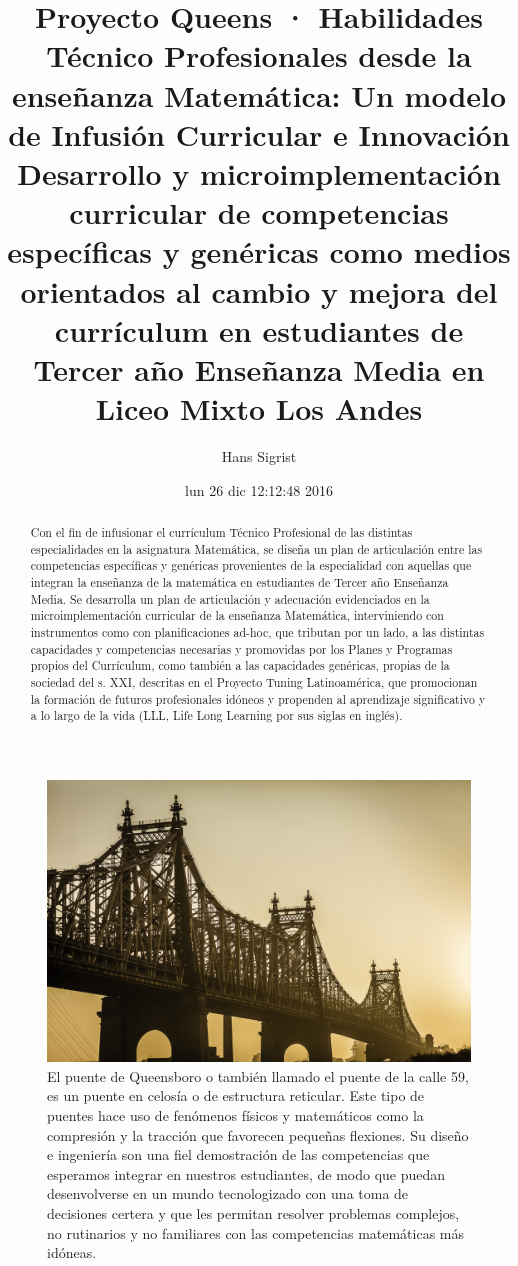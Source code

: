 \documentclass[12pt,letterpaper,article,x11names]{memoir}
\title{}
\author{Hans Sigrist}
\date{lun 26 dic 12:12:48 2016}
\title{Proyecto Queens · Habilidades Técnico Profesionales desde la enseñanza Matemática: Un modelo de Infusión Curricular e Innovación\\\medskip
\large Desarrollo y microimplementación curricular de competencias específicas y genéricas como medios orientados al cambio y mejora del currículum en estudiantes de Tercer año Enseñanza Media en Liceo Mixto Los Andes}
\begin{document}
\maketitle
\begin{abstract}
Con el fin de infusionar el currículum Técnico Profesional de las distintas especialidades en la asignatura Matemática, se diseña un plan de articulación entre las competencias específicas y genéricas provenientes de la especialidad con aquellas que integran la enseñanza de la matemática en estudiantes de Tercer año Enseñanza Media. Se desarrolla un plan de articulación y adecuación evidenciados en la microimplementación curricular de la enseñanza Matemática, interviniendo con instrumentos como con planificaciones ad-hoc, que tributan por un lado, a las distintas capacidades y competencias necesarias y promovidas por los Planes y Programas propios del Currículum, como también a las capacidades genéricas, propias de la sociedad del s. XXI, descritas en el Proyecto Tuning Latinoamérica, que promocionan la formación de futuros profesionales idóneos y propenden al aprendizaje significativo y a lo largo de la vida (LLL, Life Long Learning por sus siglas en inglés).
\end{abstract}

\begin{figure}[htbp]
\centering
\includegraphics[width=.9\linewidth]{queens.jpg}
\caption{\label{fig:org05cedaa}
El puente de Queensboro o también llamado el puente de la calle 59, es un puente en celosía o de estructura reticular. Este tipo de puentes hace uso de fenómenos físicos y matemáticos como la compresión y la tracción que favorecen pequeñas flexiones. Su diseño e ingeniería son una fiel demostración de las competencias que esperamos integrar en nuestros estudiantes, de modo que puedan desenvolverse en un mundo tecnologizado con una toma de decisiones certera y que les permitan resolver problemas complejos, no rutinarios y no familiares con las competencias matemáticas más idóneas.}
\end{figure}
\end{document}
